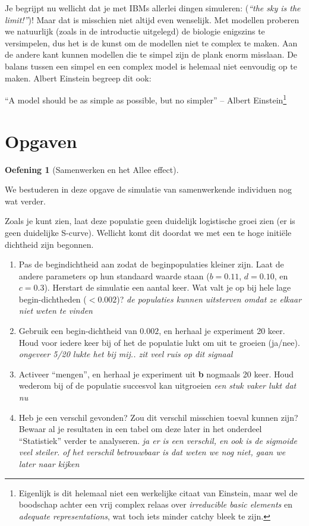 \documentclass[
  a4paper,
]{scrbook}
\providecommand{\tightlist}{%
  \setlength{\itemsep}{0pt}\setlength{\parskip}{0pt}}\usepackage{longtable,booktabs,array}
\theoremstyle{definition}
\newtheorem{exercise}{Oefening}[chapter]
\theoremstyle{remark}
\begin{document}
Je begrijpt nu wellicht dat je met IBMs allerlei dingen simuleren:
(\emph{``the sky is the limit!''})! Maar dat is misschien niet altijd
even wenselijk. Met modellen proberen we natuurlijk (zoals in de
introductie uitgelegd) de biologie enigszins te versimpelen, dus het is
de kunst om de modellen niet te complex te maken. Aan de andere kant
kunnen modellen die te simpel zijn de plank enorm misslaan. De balans
tussen een simpel en een complex model is helemaal niet eenvoudig op te
maken. Albert Einstein begreep dit ook:

``A model should be as simple as possible, but no simpler'' -- Albert
Einstein\footnote{Eigenlijk is dit helemaal niet een werkelijke citaat
  van Einstein, maar wel de boodschap achter een vrij complex relaas
  over \emph{irreducible basic elements} en \emph{adequate
  representations}, wat toch iets minder catchy bleek te zijn.}

\hypertarget{opgaven-3}{%
\section{Opgaven}\label{opgaven-3}}

\begin{exercise}[Samenwerken en het Allee
effect]\protect\hypertarget{exr-samenwerkenallee}{}\label{exr-samenwerkenallee}

We bestuderen in deze opgave de simulatie van samenwerkende individuen
nog wat verder.

Zoals je kunt zien, laat deze populatie geen duidelijk logistische groei
zien (er is geen duidelijke S-curve). Wellicht komt dit doordat we met
een te hoge initiële dichtheid zijn begonnen.

\begin{enumerate}
\def\labelenumi{\alph{enumi}.}
\tightlist
\item
  Pas de begindichtheid aan zodat de beginpopulaties kleiner zijn. Laat
  de andere parameters op hun standaard waarde staan (\(b=0.11\),
  \(d=0.10\), en \(c=0.3\)). Herstart de simulatie een aantal keer. Wat
  valt je op bij hele lage begin-dichtheden (\(<0.002\))? \emph{de
  populaties kunnen uitsterven omdat ze elkaar niet weten te vinden}
\item
  Gebruik een begin-dichtheid van \(0.002\), en herhaal je experiment 20
  keer. Houd voor iedere keer bij of het de populatie lukt om uit te
  groeien (ja/nee). \emph{ongeveer 5/20 lukte het bij mij.. zit veel
  ruis op dit signaal}
\item
  Activeer ``mengen'', en herhaal je experiment uit \textbf{b} nogmaals
  20 keer. Houd wederom bij of de populatie succesvol kan uitgroeien
  \emph{een stuk vaker lukt dat nu}
\item
  Heb je een verschil gevonden? Zou dit verschil misschien toeval kunnen
  zijn? Bewaar al je resultaten in een tabel om deze later in het
  onderdeel ``Statistiek'' verder te analyseren. \emph{ja er is een
  verschil, en ook is de sigmoide veel steiler. of het verschil
  betrouwbaar is dat weten we nog niet, gaan we later naar kijken}
\end{enumerate}

\end{exercise}
\end{document}
